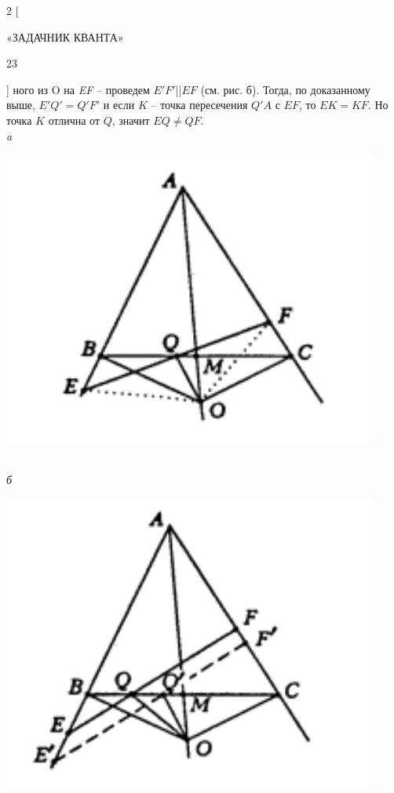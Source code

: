 \setlength\parindent{0pt}\pagestyle{empty}

%

\begin{multicols}{2}
[
\begin{center}
«З\;А\;Д\;А\;Ч\;Н\;И\;К\; К\;В\;А\;Н\;Т\;А»\begin{flushright}23\end{flushright}
\end{center}
]
ного из O на \textit{EF} -- проведем $E'F'$||$EF$ (см. рис. б). Тогда, по доказанному выше, $E'Q' = Q'F'$ и если $K$ -- точка пересечения $Q'A$ с $EF$, то $EK = KF$. Но точка $K$ отлична от $Q$, значит $EQ \neq QF$.\\
\textit{a}\begin{center}\includegraphics[scale=0.2]{1.png}\end{center}\\
\textit{б}\begin{center}\includegraphics[scale=0.2]{2.png}\end{center}\\

\end{multicols}

